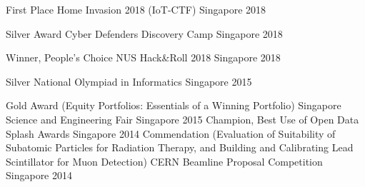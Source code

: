 


\begin{cvhonors}

  \cvhonor
    {First Place} %
    {Home Invasion 2018 (IoT-CTF)} %
    {Singapore} %
    {2018} %

  \cvhonor
    {Silver Award} %
    {Cyber Defenders Discovery Camp} %
    {Singapore} %
    {2018} %

  \cvhonor
    {Winner, People's Choice} %
    {NUS Hack\&Roll 2018} %
    {Singapore} %
    {2018} %

  \cvhonor
    {Silver} %
    {National Olympiad in Informatics} %
    {Singapore} %
    {2015} %

  \cvhonor
    {Gold Award (Equity Portfolios: Essentials of a Winning Portfolio)} %
    {Singapore Science and Engineering Fair} %
    {Singapore} %
    {2015} %
  \cvhonor
    {Champion, Best Use of Open Data} %
    {Splash Awards} %
    {Singapore} %
    {2014} %
  \cvhonor
    {Commendation (Evaluation of Suitability of Subatomic Particles for Radiation Therapy, and Building and Calibrating Lead Scintillator for Muon Detection)} %
    {CERN Beamline Proposal Competition} %
    {Singapore} %
    {2014} %
\end{cvhonors}
